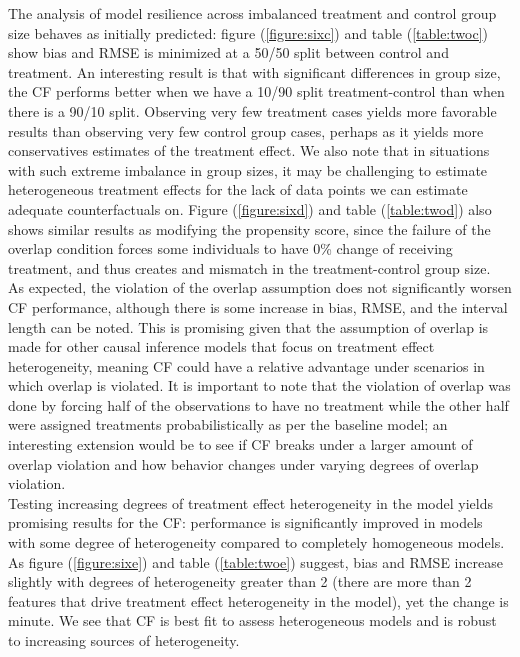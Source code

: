 \documentclass[12pt]{article}
\begin{document}
The analysis of model resilience across imbalanced treatment and control group
size behaves as initially predicted: figure (\ref{figure:sixc}) and table
(\ref{table:twoc}) show bias and RMSE is minimized at a 50/50 split between
control and treatment. An interesting result is that with significant
differences in group size, the CF performs better when we have a 10/90 split
treatment-control than when there is a 90/10 split. Observing very few treatment
cases yields more favorable results than observing very few control group cases,
perhaps as it yields more conservatives estimates of the treatment effect. We
also note that in situations with such extreme imbalance in group sizes, it may
be challenging to estimate heterogeneous treatment effects for the lack of data
points we can estimate adequate counterfactuals on. Figure (\ref{figure:sixd})
and table (\ref{table:twod}) also shows similar results as modifying the
propensity score, since the failure of the overlap condition forces some
individuals to have 0\% change of receiving treatment, and thus creates and
mismatch in the treatment-control group size. \\

As expected, the violation of the overlap assumption does not significantly
worsen CF performance, although there is some increase in bias, RMSE, and the
interval length can be noted. This is promising given that the assumption of
overlap is made for other causal inference models that focus on treatment effect
heterogeneity, meaning CF could have a relative advantage under scenarios in
which overlap is violated. It is important to note that the violation of overlap
was done by forcing half of the observations to have no treatment while the
other half were assigned treatments probabilistically as per the baseline model;
an interesting extension would be to see if CF breaks under a larger amount of
overlap violation and how behavior changes under varying degrees of overlap
violation.\\ 

Testing increasing degrees of treatment effect heterogeneity in the model yields
promising results for the CF:  performance is significantly improved in models
with some degree of heterogeneity compared to completely homogeneous models. As
figure (\ref{figure:sixe}) and table (\ref{table:twoe}) suggest, bias and RMSE
increase slightly with degrees of heterogeneity greater than 2 (there are more
than 2 features that drive treatment effect heterogeneity in the model), yet the
change is minute. We see that CF is best fit to assess heterogeneous models and
is robust to increasing sources of heterogeneity. \\ 
\end{document}
